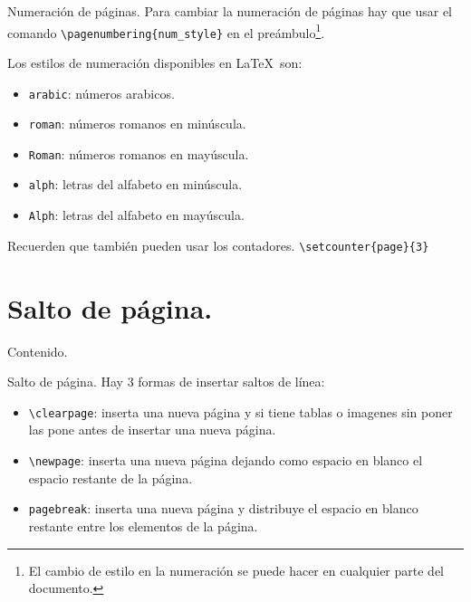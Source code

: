 \documentclass[dvipsnames,xcolor, handout]{beamer}
\theoremstyle{plain}
\theoremstyle{definition}
\begin{document}
\begin{frame}[fragile]{Numeración de páginas.}
Para cambiar la numeración de páginas hay que usar el comando \verb!\pagenumbering{num_style}! en el preámbulo\footnote{El cambio de estilo en la numeración se puede hacer en cualquier parte del documento.}.\pause

Los estilos de numeración disponibles en \LaTeX\ son:
\begin{itemize}
    \item \verb!arabic!: números arabicos.
    \item \verb!roman!: números romanos en minúscula.
    \item \verb!Roman!: números romanos en mayúscula.
    \item \verb!alph!: letras del alfabeto en minúscula.
    \item \verb!Alph!: letras del alfabeto en mayúscula.
\end{itemize}\pause

Recuerden que también pueden usar los contadores. \verb!\setcounter{page}{3}!

\end{frame}

\section{Salto de página.}
\begin{frame}{Contenido.}
  \begin{footnotesize}
\vspace*{-1cm}
\begin{multicols}{2}
  \tableofcontents[currentsection]
\end{multicols}
\end{footnotesize}
\end{frame}

\begin{frame}[fragile]{Salto de página.}
    Hay 3 formas de insertar saltos de línea:
    \begin{itemize}
        \item \verb!\clearpage!: inserta una nueva página y si tiene tablas o imagenes sin poner las pone antes de insertar una nueva página.
        \item \verb!\newpage!: inserta una nueva página dejando como espacio en blanco el espacio restante de la página.
        \item \verb!pagebreak!: inserta una nueva página y distribuye el espacio en blanco restante entre los elementos de la página. 
    \end{itemize}
\end{frame}
\end{document}

